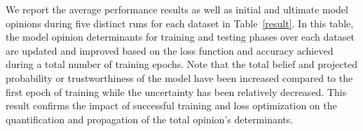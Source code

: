 We report the average performance results as well as initial and ultimate model opinions during five distinct runs for each dataset in Table~\ref{result}. In this table, the model opinion determinants for training and testing phases over each dataset are updated and improved based on the loss function and accuracy achieved during a total number of training epochs. Note that the total belief and projected probability or trustworthiness of the model have been increased compared to the first epoch of training while the uncertainty has been relatively decreased. This result confirms the impact of successful training and loss optimization on the quantification and propagation of the total opinion's determinants. 


